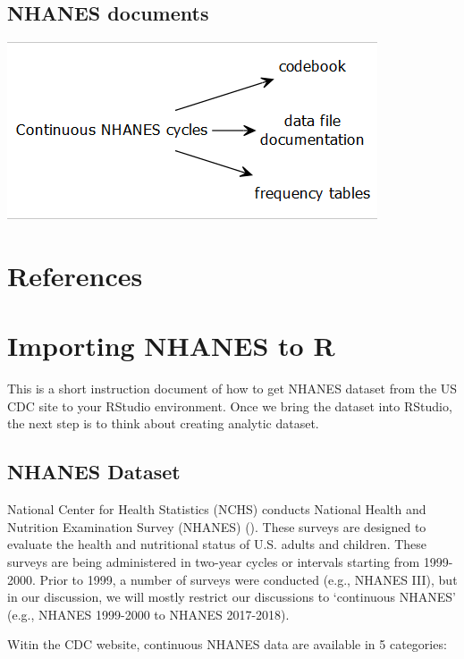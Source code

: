 \documentclass[
]{book}
\begin{document}
\hypertarget{nhanes-documents}{%
\section{NHANES documents}\label{nhanes-documents}}

\includegraphics[width=0.65\linewidth]{images/g3}

\hypertarget{references}{%
\chapter{References}\label{references}}

\hypertarget{importing-nhanes-to-r}{%
\chapter{Importing NHANES to R}\label{importing-nhanes-to-r}}

This is a short instruction document of how to get NHANES dataset from the US CDC site to your RStudio environment. Once we bring the dataset into RStudio, the next step is to think about creating analytic dataset.

\hypertarget{nhanes-dataset}{%
\section{NHANES Dataset}\label{nhanes-dataset}}

National Center for Health Statistics (NCHS) conducts National Health and Nutrition Examination Survey (NHANES) (\citet{nhanes}). These surveys are designed to evaluate the health and nutritional status of U.S. adults and children. These surveys are being administered in two-year cycles or intervals starting from 1999-2000. Prior to 1999, a number of surveys were conducted (e.g., NHANES III), but in our discussion, we will mostly restrict our discussions to `continuous NHANES' (e.g., NHANES 1999-2000 to NHANES 2017-2018).

Witin the CDC website, continuous NHANES data are available in 5 categories:
\end{document}
